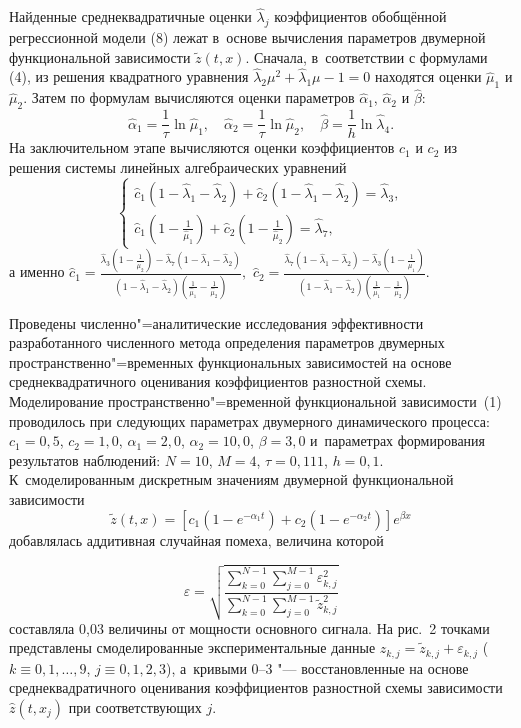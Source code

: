 Найденные среднеквадратичные оценки $\hat{\lambda}_j$ коэффициентов обобщённой регрессионной модели (8) лежат в~основе вычисления параметров двумерной функциональной зависимости $\tilde{z}(t,x)$. 
Сначала, в~соответствии с формулами (4), из решения квадратного уравнения $\hat{\lambda}_2\mu^2+\hat{\lambda}_1\mu-1=0$ находятся оценки $\hat\mu_1$ и $\hat\mu_2$. Затем по формулам вычисляются оценки параметров $\hat \alpha_1$, $\hat{\alpha}_2$ и $\hat{\beta}$: $$\hat{\alpha}_1=\frac{1}{\tau}\ln\hat{\mu}_1,\quad  \hat{\alpha}_2=\frac{1}{\tau}\ln\hat{\mu}_2, \quad \hat{\beta}=\frac{1}{h}\ln\hat{\lambda}_4.$$ На заключительном этапе вычисляются оценки коэффициентов $c_1$ и $c_2$ из решения системы линейных алгебраических уравнений
\[ \left\{
\begin{array}{ll}
\hat{c}_1(1-\hat{\lambda}_1-\hat{\lambda}_2)+\hat{c}_2(1-\hat{\lambda}_1-\hat{\lambda}_2)=\hat{\lambda}_3,\\
\hat{c}_1(1-\frac{1}{\hat{\mu}_1})+\hat{c}_2(1-\frac{1}{\hat{\mu}_2})=\hat{\lambda}_7,
\end{array}\right. \]
а именно
$\textstyle \hat{c}_1=\frac{\hat{\lambda}_3(1-\frac{1}{\hat{\mu}_2})-\hat{\lambda}_7(1-\hat{\lambda}_1-\hat{\lambda}_2)}{(1-\hat{\lambda}_1-\hat{\lambda}_2)(\frac{1}{\hat{\mu}_1}-\frac{1}{\hat{\mu}_2})}, $  $\hat{c}_2=\frac{\hat{\lambda}_7(1-\hat{\lambda}_1-\hat{\lambda}_2)-\hat{\lambda}_3(1-\frac{1}{\hat{\mu}_1})}{(1-\hat{\lambda}_1-\hat{\lambda}_2)(\frac{1}{\hat{\mu}_1}-\frac{1}{\hat{\mu}_2})}.$

Проведены численно"=аналитические исследования эффективности разработанного численного метода определения параметров двумерных пространственно"=временных функциональных зависимостей на основе среднеквадратичного оценивания коэффициентов разностной схемы. Моделирование пространственно"=временной функциональной зависимости~(1) проводилось при следующих параметрах двумерного динамического процесса: $c_1=0,5$, $c_2=1,0$, $\alpha_1=2,0$, $\alpha_2=10,0$, $\beta=3,0$ и~параметрах формирования результатов наблюдений: $N=10$, $M=4$, $\tau=0,111$, $h=0,1$. 
К~смоделированным дискретным значениям двумерной функциональной зависимости 
$$\tilde{z}(t,x)=\left[c_1(1-e^{-\alpha_1t})+c_2(1-e^{-\alpha_2t})\right]e^{\beta x}$$ 
добавлялась аддитивная случайная помеха, величина которой 

$$\varepsilon=\sqrt{\frac{\sum^{N-1}_{k=0}\sum^{M-1}_{j=0}\varepsilon_{k,j}^2}{\sum^{N-1}_{k=0}\sum^{M-1}_{j=0}\tilde{z}_{k,j}^2}}$$
\noindent составляла 0,03 величины от мощности основного сигнала. 
На рис.~2 точками представлены смоделированные экспериментальные данные $z_{k,j}=\tilde{z}_{k,j}+\varepsilon_{k,j}$ ($k\equiv 0, 1, \ldots, 9$, $j\equiv 0, 1, 2, 3$), а~кривыми 0--3 "--- восстановленные на основе среднеквадратичного оценивания коэффициентов разностной схемы зависимости $\hat{z}(t,x_j)$ при соответствующих $j$.

